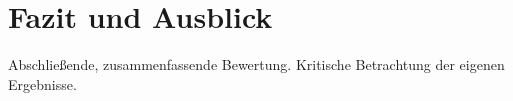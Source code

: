 \documentclass[conference]{IEEEtran}
\begin{document}
\section{Fazit und Ausblick}
Abschließende, zusammenfassende Bewertung. Kritische Betrachtung der eigenen Ergebnisse.








%
%
\end{document}
